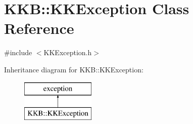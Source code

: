 \hypertarget{class_k_k_b_1_1_k_k_exception}{}\section{K\+KB\+:\+:K\+K\+Exception Class Reference}
\label{class_k_k_b_1_1_k_k_exception}


{\ttfamily \#include $<$K\+K\+Exception.\+h$>$}

Inheritance diagram for K\+KB\+:\+:K\+K\+Exception\+:\begin{figure}[H]
\begin{center}
\leavevmode
\includegraphics[height=2.000000cm]{class_k_k_b_1_1_k_k_exception}
\end{center}
\end{figure}
